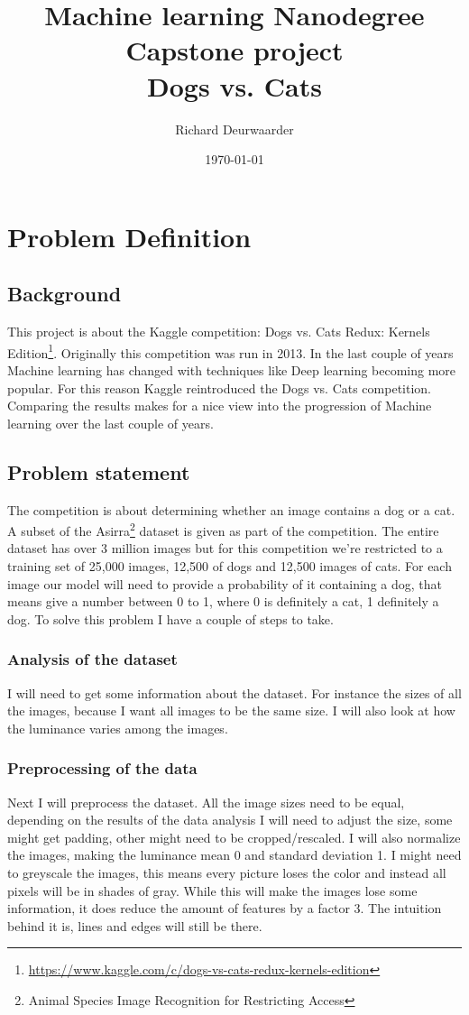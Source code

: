 \documentclass[11pt]{article}
\title{\textbf{Machine learning Nanodegree\\ Capstone project}\\ Dogs vs. Cats}
\author{Richard Deurwaarder}
\date{\today}
\begin{document}
\maketitle

\section{Problem	 Definition}

\subsection{Background}
This project is about the Kaggle competition: Dogs vs. Cats Redux: Kernels Edition\footnote{\url{https://www.kaggle.com/c/dogs-vs-cats-redux-kernels-edition}}. Originally this competition was run in 2013. In the last couple of years Machine learning has changed with techniques like Deep learning becoming more popular. For this reason Kaggle reintroduced the Dogs vs. Cats competition. Comparing the results makes for a nice view into the progression of Machine learning over the last couple of years.
\subsection{Problem statement}
The competition is about determining whether an image contains a dog or a cat. A subset of the Asirra\footnote{Animal Species Image Recognition for Restricting Access} dataset is given as part of the competition. The entire dataset has over 3 million images but for this competition we're restricted to a training set of 25,000 images, 12,500 of dogs and 12,500 images of cats. For each image our model will need to provide a probability of it containing a dog, that means give a number between 0 to 1, where 0 is definitely a cat, 1 definitely a dog.
To solve this problem I have a couple of steps to take.
\subsubsection{Analysis of the dataset}
I will need to get some information about the dataset. For instance the sizes of all the images, because I want all images to be the same size. I will also look at how the luminance varies among the images.
\subsubsection{Preprocessing of the data}
Next I will preprocess the dataset. All the image sizes need to be equal, depending on the results of the data analysis I will need to adjust the size, some might get padding, other might need to be cropped/rescaled. I will also normalize the images, making the luminance mean 0 and standard deviation 1. I might need to greyscale the images, this means every picture loses the color and instead all pixels will be in shades of gray. While this will make the images lose some information, it does reduce the amount of features by a factor 3. The intuition behind it is, lines and edges will still be there.
\end{document}
